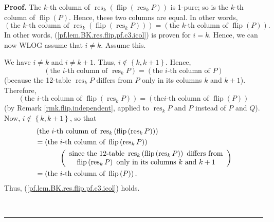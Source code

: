 \documentclass[numbers=enddot,12pt,final,onecolumn,notitlepage]{scrartcl}%
\theoremstyle{definition}
\newenvironment{proof}[1][Proof]{\noindent\textbf{#1.} }{\ \rule{0.5em}{0.5em}}
\newenvironment{verlong}{}{}
\begin{document}
\begin{verlong}
\begin{proof}
The $k$-th column of $\operatorname*{res}\nolimits_{k}\left(
\operatorname*{flip}\left(  \operatorname*{res}\nolimits_{k}P\right)  \right)
$ is 1-pure; so is the $k$-th column of $\operatorname*{flip}\left(  P\right)
$. Hence, these two columns are equal. In other words,%
\[
\left(  \text{the }k\text{-th column of }\operatorname*{res}\nolimits_{k}%
\left(  \operatorname*{flip}\left(  \operatorname*{res}\nolimits_{k}P\right)
\right)  \right)  =\left(  \text{the }k\text{-th column of }%
\operatorname*{flip}\left(  P\right)  \right)  .
\]
In other words, (\ref{pf.lem.BK.res.flip.pf.c3.icol}) is proven for $i=k$.
Hence, we can now WLOG assume that $i\neq k$. Assume this.

We have $i\neq k$ and $i\neq k+1$. Thus, $i\notin\left\{  k,k+1\right\}  $.
Hence,%
\[
\left(  \text{the }i\text{-th column of }\operatorname*{res}\nolimits_{k}%
P\right)  =\left(  \text{the }i\text{-th column of }P\right)
\]
(because the 12-table $\operatorname*{res}\nolimits_{k}P$ differs from $P$
only in its columns $k$ and $k+1$). Therefore,%
\[
\left(  \text{the }i\text{-th column of }\operatorname*{flip}\left(
\operatorname*{res}\nolimits_{k}P\right)  \right)  =\left(  \text{the
}i\text{-th column of }\operatorname*{flip}\left(  P\right)  \right)
\]
(by Remark \ref{rmk.flip.independent}, applied to $\operatorname*{res}%
\nolimits_{k}P$ and $P$ instead of $P$ and $Q$). Now, $i\notin\left\{
k,k+1\right\}  $, so that%
\begin{align*}
&  \left(  \text{the }i\text{-th column of }\operatorname*{res}\nolimits_{k}%
\left(  \operatorname*{flip}\left(  \operatorname*{res}\nolimits_{k}P\right)
\right)  \right) \\
&  =\left(  \text{the }i\text{-th column of }\operatorname*{flip}\left(
\operatorname*{res}\nolimits_{k}P\right)  \right) \\
&  \ \ \ \ \ \ \ \ \ \ \left(
\begin{array}
[c]{c}%
\text{since the 12-table }\operatorname*{res}\nolimits_{k}\left(
\operatorname*{flip}\left(  \operatorname*{res}\nolimits_{k}P\right)  \right)
\text{ differs from}\\
\operatorname*{flip}\left(  \operatorname*{res}\nolimits_{k}P\right)  \text{
only in its columns }k\text{ and }k+1
\end{array}
\right) \\
&  =\left(  \text{the }i\text{-th column of }\operatorname*{flip}\left(
P\right)  \right)  .
\end{align*}
Thus, (\ref{pf.lem.BK.res.flip.pf.c3.icol}) holds.


\end{proof}
\end{verlong}
\end{document}
